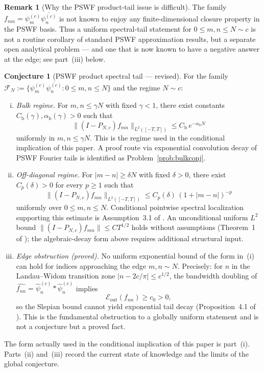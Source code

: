 \documentclass[12pt,a4paper]{amsart}
\theoremstyle{definition}
\newtheorem{remark}[theorem]{Remark}
\newtheorem{conjecture}[theorem]{Conjecture}
\newcommand{\PN}{P_{N,c}}
\begin{document}
\begin{remark}[Why the PSWF product-tail issue is difficult]
The family $f_{mn}=\psi_m^{(c)}\overline{\psi_n^{(c)}}$ is not known to enjoy
any finite-dimensional closure property in the PSWF basis. Thus a uniform
spectral-tail statement for $0\le m,n\le N\sim c$ is not a routine corollary
of standard PSWF approximation results, but a separate open analytical
problem --- and one that is now known to have a negative answer at the edge;
see part~(iii) below.
\end{remark}

\begin{conjecture}[PSWF product spectral tail --- revised]\label{conj:pswf_product_tail}
For the family
$\mathcal{F}_N:=\{\psi_m^{(c)}\overline{\psi_n^{(c)}}:0\le m,n\le N\}$
and the regime $N\sim c$:

\begin{enumerate}[(i)]
\item \emph{Bulk regime.}
For $m,n\le \gamma N$ with fixed $\gamma<1$,
there exist constants $C_{\mathrm{b}}(\gamma),\alpha_{\mathrm{b}}(\gamma)>0$
such that
\[
  \|(I-\PN)f_{mn}\|_{L^2([-T,T])}
  \le C_{\mathrm{b}}\,e^{-\alpha_{\mathrm{b}} N}
\]
uniformly in $m,n\le\gamma N$.
This is the regime used in the conditional implication of this paper.
A proof route via exponential convolution decay of PSWF Fourier tails
is identified as Problem~\ref{prob:bulkconj}.

\item \emph{Off-diagonal regime.}
For $|m-n|\ge\delta N$ with fixed $\delta>0$,
there exist $C_p(\delta)>0$ for every $p\ge1$ such that
\[
  \|(I-\PN)f_{mn}\|_{L^2([-T,T])}
  \le C_p(\delta)\,(1+|m-n|)^{-p}
\]
uniformly over $0\le m,n\le N$.
Conditional pointwise spectral localization supporting this
estimate is Assumption~3.1 of \cite{PaperIII}.
An unconditional uniform $L^2$ bound
$\|(I-\PN)f_{mn}\|\le C T^{1/2}$ holds without assumptions
(Theorem~1 of \cite{PaperIII}); the algebraic-decay
form above requires additional structural input.

\item \emph{Edge obstruction (proved).}
No uniform exponential bound of the form in~(i) can hold for indices
approaching the edge $m,n\sim N$.
Precisely: for $n$ in the Landau--Widom transition zone
$|n - 2c/\pi|\le c^{1/2}$, the bandwidth doubling of
$\widehat{f_{nn}}=\hat\psi_n^{(c)}*\hat\psi_n^{(c)}$ implies
\[
  \mathcal{E}_{\mathrm{out}}(f_{nn}) \ge c_0 > 0,
\]
so the Slepian bound cannot yield exponential tail decay
(Proposition~4.1 of \cite{PaperIII}).
This is the fundamental obstruction to a globally uniform statement
and is not a conjecture but a proved fact.
\end{enumerate}

The form actually used in the conditional implication of this paper
is part~(i). Parts~(ii) and~(iii) record the current state
of knowledge and the limits of the global conjecture.
\end{conjecture}
\end{document}
